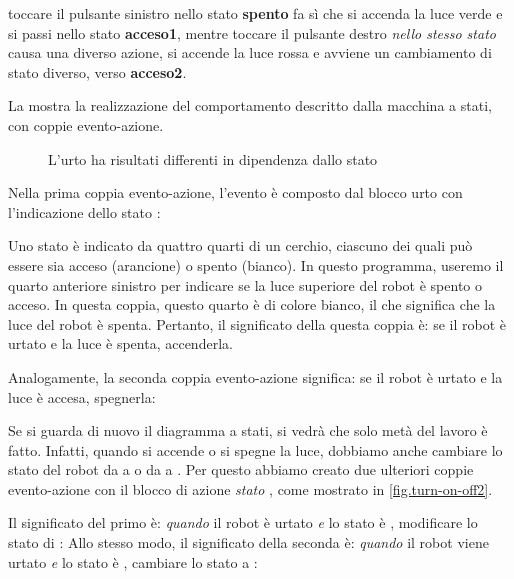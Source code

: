 toccare il pulsante sinistro nello stato \textbf{spento} fa sì che si accenda la luce verde
e si passi nello stato \textbf{acceso1}, mentre
toccare il pulsante destro \emph{nello stesso stato} causa una diverso
azione, si accende la luce rossa e avviene un cambiamento di stato diverso, verso \textbf{acceso2}.


La  mostra la realizzazione del comportamento descritto dalla macchina a stati, con coppie evento-azione.


\begin{figure}
	\hfill
	\caption{L'urto ha risultati differenti in dipendenza dallo stato}
	\label{fig.turn-on-off}
\end{figure}

Nella prima coppia evento-azione, l'evento è composto dal blocco
urto con l'indicazione dello stato : 

Uno stato è indicato da quattro quarti di un cerchio, ciascuno dei quali può essere
sia acceso (arancione) o spento (bianco). In questo programma, useremo il quarto anteriore sinistro per
indicare se la luce superiore del robot è spento o acceso. In questa coppia, questo
quarto è di colore bianco, il che significa che la luce del robot è spenta.
Pertanto, il significato della questa coppia è: se il robot è urtato e la luce è spenta, accenderla.

Analogamente, la seconda coppia evento-azione significa: se il robot
è urtato e la luce è accesa, spegnerla: 

Se si guarda di nuovo il diagramma a stati, si
vedrà che solo metà del lavoro è fatto. Infatti, quando si accende o si spegne la luce, dobbiamo anche cambiare lo stato del robot da  a
 o da  a . Per questo abbiamo creato due
ulteriori coppie evento-azione con il  blocco di azione \emph{stato}
, come mostrato in \cref{fig.turn-on-off2}.

Il significato del primo è: \emph{quando}  il robot è urtato
\emph{e} lo stato è , modificare lo stato di :
Allo stesso modo, il significato della seconda è: \emph{quando} il robot
viene urtato \emph{e} lo stato è , cambiare lo stato a : 

